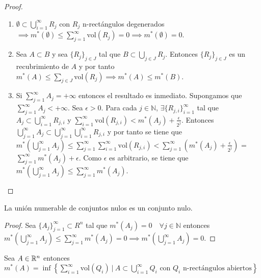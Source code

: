 \begin{proof}
\leavevmode
\begin{enumerate}
    \item $\emptyset \subset \bigcup_{i=1}^\infty R_j$ con $R_j$ n-rectángulos degenerados $\implies m^*(\emptyset) \leq \sum_{j=1}^\infty \text{vol}(R_j) = 0 \implies m^*(\emptyset) = 0$.
    \item Sea $A \subset B$ y sea $\{R_j\}_{j \in J}$ tal que $B \subset \bigcup_{j \in J} R_j$. Entonces $\{R_j\}_{j \in J}$ es un recubrimiento de $A$ y por tanto $m^*(A) \leq \sum_{j \in J} \text{vol}(R_j) \implies m^*(A) \leq m^*(B)$.
    \item Si $\sum_{j=1}^{\infty}{A_j} = +\infty$ entonces el resultado es inmediato. Supongamos que $\sum_{j=1}^{\infty}{A_j} < +\infty$. Sea $\epsilon > 0$. Para cada $j \in \mathbb{N}$, $\exists \{R_{j,i}\}_{i = 1}^\infty$ tal que $A_j \subset \bigcup_{i = 1}^\infty R_{j,i}$ y $\sum_{i = 1}^\infty \text{vol}(R_{j,i}) < m^*(A_j) + \frac{\epsilon}{2^j}$. Entonces $\bigcup_{j=1}^{\infty} A_j \subset \bigcup_{j=1}^{\infty} \bigcup_{i = 1}^\infty R_{j,i}$ y por tanto se tiene que  $m^*(\bigcup_{j=1}^{\infty} A_j) \leq \sum_{j=1}^{\infty} \sum_{i = 1}^\infty \text{vol}(R_{j,i}) < \sum_{j=1}^{\infty} (m^*(A_j) + \frac{\epsilon}{2^j})$ = $\sum_{j=1}^{\infty} m^*(A_j) + \epsilon$. Como $\epsilon$ es arbitrario, se tiene que $m^*(\bigcup_{j=1}^{\infty} A_j) \leq \sum_{j=1}^{\infty} m^*(A_j)$.
\end{enumerate}
\end{proof}

\begin{corolario}
La unión numerable de conjuntos nulos es un conjunto nulo.
\end{corolario}

\begin{proof} 
    Sea $\{A_j\}_{j=1}^\infty \subset R^n$ tal que $m^*(A_j) = 0 \quad \forall j \in \mathbb{N}$ entonces $m^*(\bigcup_{j=1}^\infty A_j) \leq \sum_{j=1}^\infty m^*(A_j) = 0 \implies m^*(\bigcup_{j=1}^\infty A_j) = 0$.
\end{proof}

\begin{lema}
    Sea $A \in \mathbb{R}^n$ entonces $m^*(A) = \inf \left\{ \sum_{i=1}^\infty \text{vol}(Q_i) \ | \ A \subset \bigcup_{i=1}^\infty Q_i \text{ con } Q_i \text{ n-rectángulos abiertos} \right\}$
\end{lema}

